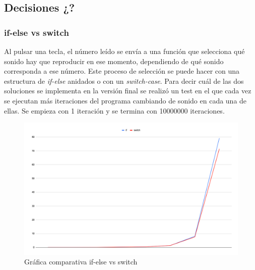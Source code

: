 \documentclass{article}
\begin{document}
 \subsection{Decisiones ¿?}

    \subsubsection{if-else vs switch}
    Al pulsar una tecla, el número leído se envía a una función que selecciona qué sonido hay que reproducir en
    ese momento, dependiendo de qué sonido corresponda a ese número. Este proceso de selección se puede hacer
    con una estructura de \textit{if-else} anidados o con un \textit{switch-case}.\newline
    Para decir cuál de las dos soluciones se implementa en la versión final se realizó un test en el que cada
    vez se ejecutan más iteraciones del programa cambiando de sonido en cada una de ellas. Se empieza con 1
    iteración y se termina con 10000000 iteraciones.\newline
    \begin{figure}[ht]
        \centering
        \includegraphics[width=\textwidth]{grafica_if_switch}
        \caption{Gráfica comparativa if-else vs switch}
    \end{figure}
    \newline
\end{document}

